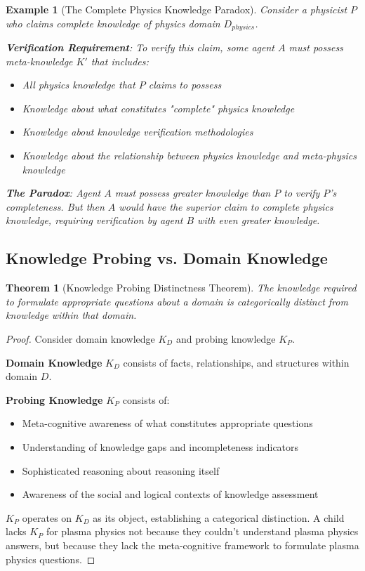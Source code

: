 \documentclass[12pt,a4paper]{article}
\newtheorem{example}{Example}
\newtheorem{theorem}{Theorem}[section]
\begin{document}
\begin{example}[The Complete Physics Knowledge Paradox]
Consider a physicist $P$ who claims complete knowledge of physics domain $D_{physics}$.

\textbf{Verification Requirement}: To verify this claim, some agent $A$ must possess meta-knowledge $K'$ that includes:
\begin{itemize}
\item All physics knowledge that $P$ claims to possess
\item Knowledge about what constitutes "complete" physics knowledge
\item Knowledge about knowledge verification methodologies
\item Knowledge about the relationship between physics knowledge and meta-physics knowledge
\end{itemize}

\textbf{The Paradox}: Agent $A$ must possess greater knowledge than $P$ to verify $P$'s completeness. But then $A$ would have the superior claim to complete physics knowledge, requiring verification by agent $B$ with even greater knowledge.
\end{example}

\subsection{Knowledge Probing vs. Domain Knowledge}

\begin{theorem}[Knowledge Probing Distinctness Theorem]
The knowledge required to formulate appropriate questions about a domain is categorically distinct from knowledge within that domain.
\end{theorem}

\begin{proof}
Consider domain knowledge $K_D$ and probing knowledge $K_P$.

\textbf{Domain Knowledge} $K_D$ consists of facts, relationships, and structures within domain $D$.

\textbf{Probing Knowledge} $K_P$ consists of:
\begin{itemize}
\item Meta-cognitive awareness of what constitutes appropriate questions
\item Understanding of knowledge gaps and incompleteness indicators
\item Sophisticated reasoning about reasoning itself
\item Awareness of the social and logical contexts of knowledge assessment
\end{itemize}

$K_P$ operates on $K_D$ as its object, establishing a categorical distinction. A child lacks $K_P$ for plasma physics not because they couldn't understand plasma physics answers, but because they lack the meta-cognitive framework to formulate plasma physics questions.
\end{proof}
\end{document}
